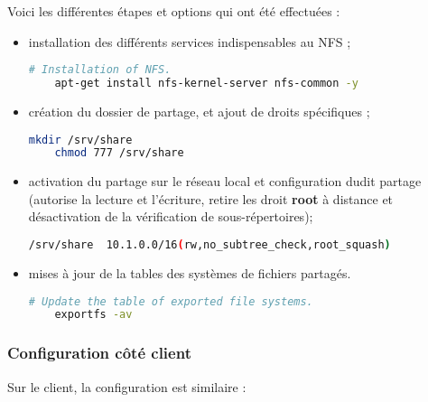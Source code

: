 Voici les différentes étapes et options qui ont été effectuées :
\begin{itemize}
\item installation des différents services indispensables au NFS ;

  \begin{lstlisting}[language=bash]
    # Installation of NFS.
    apt-get install nfs-kernel-server nfs-common -y
  \end{lstlisting}

\item création du dossier de partage, et ajout de droits
  spécifiques ;

  \begin{lstlisting}[language=bash]
    mkdir /srv/share
    chmod 777 /srv/share
  \end{lstlisting}

\item activation du partage sur le réseau local et configuration dudit
  partage (autorise la lecture et l'écriture, retire les droit \textbf{root} à
  distance et désactivation de la vérification de sous-répertoires);

  \begin{lstlisting}[language=bash]
    /srv/share  10.1.0.0/16(rw,no_subtree_check,root_squash)
  \end{lstlisting}

\item mises à jour de la tables des systèmes de fichiers partagés.

  \begin{lstlisting}[language=bash]
    # Update the table of exported file systems.
    exportfs -av
  \end{lstlisting}
\end{itemize}

\subsubsection{Configuration côté client}
\label{subsubsec:config-client}

Sur le client, la configuration est similaire :

